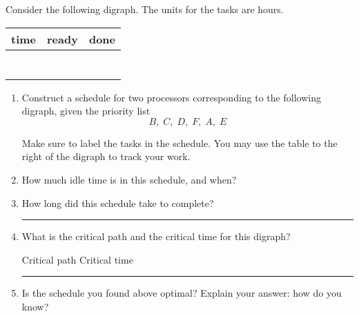 \documentclass[12pt]{article}
\renewcommand{\emph}[1]{\textsf{\textbf{#1}}}
\newcounter{probcount}
\newcounter{subprobcount}
\newenvironment{subproblems}{%
\begin{enumerate}%
\setcounter{enumi}{\value{subprobcount}}%
\renewcommand{\theenumi}{\emph{\alph{enumi}}}}%
{\setcounter{subprobcount}{\value{enumi}}\end{enumerate}}
\newcommand{\ans}[1][1in]{\rule{#1}{.5pt}}
\begin{document}
Consider the following digraph. The units for the tasks are hours.
\begin{center}
\begin{adjustbox}{valign=t,minipage={.4\textwidth}}
\anotherdigraph \hspace{1cm} 
\end{adjustbox}
\begin{adjustbox}{valign=t,minipage={.4\textwidth}}
\begin{tabular}{c | p{1in} | p{1in}}
time & ready & done \\ \hline
&&\\&&\\&&\\&&\\&&\\&&\\&&\\
\end{tabular}
\end{adjustbox}

\end{center}
\begin{subproblems}

\item Construct a schedule for two processors corresponding to the following digraph, given the priority list
\[ B,\;C,\;D,\;F,\; A,\; E\]

Make sure to label the tasks in the schedule. You may use the table to the right of the digraph to track your work.

\begin{center}
\hspace{-1cm}
\end{center}

\bigskip

\item How much idle time is in this schedule, and when? \hrulefill

\item How long did this schedule take to complete? \ans

\item What is the critical path and the critical time for this digraph?

\bigskip

Critical path \hrulefill Critical time \ans

\item Is the schedule you found above optimal? Explain your answer: how do you know?

\vfill
\end{subproblems}
\end{document}
